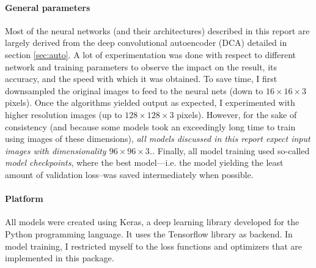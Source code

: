 \paragraph{General parameters} Most of the neural networks (and their architectures) described in this report are largely derived from the deep convolutional autoencoder (DCA) detailed in section \textcolor{blue}{\ref{sec:auto}}. A lot of experimentation was done with respect to different network and training parameters to observe the impact on the result, its accuracy, and the speed with which it was obtained. To save time, I first downsampled the original images to feed to the neural nets (down to $16 \times 16 \times 3$ pixels). Once the algorithms yielded output as expected, I experimented with higher resolution images (up to $128 \times 128 \times 3$ pixels). However, for the sake of consistency (and because some models took an exceedingly long time to train using images of these dimensions), \emph{all models discussed in this report expect input images with dimensionality $96 \times 96 \times 3$.}. Finally, all model training used so-called \textit{model checkpoints}, where the best model---i.e. the model yielding the least amount of validation loss--was saved intermediately when possible.

\paragraph{Platform} All models were created using Keras, a deep learning library developed for the Python programming language. It uses the Tensorflow library as backend. In model training, I restricted myself to the loss functions and optimizers that are implemented in this package.
